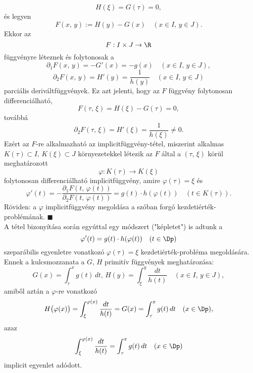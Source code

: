\[
H(\xi) = G(\tau) = 0,
\]
és legyen
\[
F(x, \, y) := H(y) - G(x) \quad (x \in I, \, y \in J).
\]
Ekkor az
\[
F : I \times J \to \R
\]
függvényre léteznek és folytonosak a
\[
\partial_1 F(x, \, y) = -G'(x) = -g(x) \quad (x \in I, \, y \in J),
\]
\[
\partial_2 F(x, \, y) = H'(y) = \frac{1}{h(y)} \quad (x \in I, \, y \in J)
\]
parciális deriváltfüggvények. Ez azt jelenti, hogy az $F$ függvény folytonosan differenciálható,
\[
F(\tau, \, \xi) = H(\xi) - G(\tau) = 0,
\]
továbbá
\[
\partial_2 F(\tau, \, \xi) = H'(\xi) = \frac{1}{h(\xi)} \neq 0.
\]
Ezért az $F$-re alkalmazható az implicitfüggvény-tétel, miszerint alkalmas $K(\tau) \subset I, \, K(\xi) \subset J$ környezetekkel létezik az $F$ által a $(\tau, \, \xi)$ körül meghatározott
\[
\varphi : K(\tau) \to K(\xi)
\]
folytonosan differenciálható implicitfüggvény, amire $\varphi(\tau) = \xi$ és
\[
\varphi'(t) = -\frac{\partial_1 F(t, \, \varphi(t))}{\partial_2 F(t, \, \varphi(t))} = g(t) \cdot h(\varphi(t)) \quad (t \in K(\tau)).
\]
Röviden: a $\varphi$ implicitfüggvény megoldása a szóban forgó kezdetiérték-problémának. $\blacksquare$\\

A tétel bizonyítása során egyúttal egy módszert ("képletet") is adtunk a
\[
\varphi'(t) = g(t) \cdot h(\varphi(t)) \quad (t \in \Dp)
\]
szeparábilis egyenletre vonatkozó $\varphi(\tau) =\xi$ kezdetiérték-probléma megoldására. Ennek a kulcsmozzanata a $G, \, H$ primitív függvények meghatározása:
\[
G(x) = \int_\tau^x g(t) \, dt, \, H(y) = \int_\xi^y \frac{dt}{h(t)} \quad (x \in I, \, y \in J),
\]
amiből aztán a $\varphi$-re vonatkozó
\[
H\big( \varphi(x) \big) = \int_\xi^{\varphi(x)} \frac{dt}{h(t)} = G(x) = \int_\tau^x g(t) \, dt \quad (x \in \Dp),
\]
azaz
\[
\int_\xi^{\varphi(x)} \frac{dt}{h(t)} = \int_\tau^x g(t) \, dt \quad (x \in \Dp)
\]
implicit egyenlet adódott.
